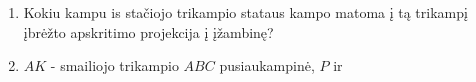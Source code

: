 \begin{enumerate}
\item Kokiu kampu is stačiojo trikampio stataus kampo matoma
  į tą trikampį įbrėžto apskritimo projekcija į įžambinę?
\item $AK$ - smailiojo trikampio $ABC$ pusiaukampinė, $P$ ir

\end{enumerate}
